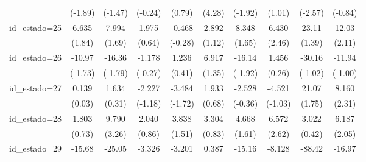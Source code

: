 {\begin{tabular}{l*{9}{c}}
                    &     (-1.89)         &     (-1.47)         &     (-0.24)         &      (0.79)         &      (4.28)         &     (-1.92)         &      (1.01)         &     (-2.57)         &     (-0.84)         \\
[1em]
id\_estado=25        &       6.635         &       7.994         &       1.975         &      -0.468         &       2.892         &       8.348         &       6.430\sym{*}  &       23.11         &       12.03\sym{*}  \\
                    &      (1.84)         &      (1.69)         &      (0.64)         &     (-0.28)         &      (1.12)         &      (1.65)         &      (2.46)         &      (1.39)         &      (2.11)         \\
[1em]
id\_estado=26        &      -10.97         &      -16.36         &      -1.178         &       1.236         &       6.917         &      -16.14         &       1.456         &      -30.16         &      -11.94         \\
                    &     (-1.73)         &     (-1.79)         &     (-0.27)         &      (0.41)         &      (1.35)         &     (-1.92)         &      (0.26)         &     (-1.02)         &     (-1.00)         \\
[1em]
id\_estado=27        &       0.139         &       1.634         &      -2.227         &      -3.484         &       1.933         &      -2.528         &      -4.521         &       21.07         &       8.160\sym{*}  \\
                    &      (0.03)         &      (0.31)         &     (-1.18)         &     (-1.72)         &      (0.68)         &     (-0.36)         &     (-1.03)         &      (1.75)         &      (2.31)         \\
[1em]
id\_estado=28        &       1.803         &       9.790\sym{**} &       2.040         &       3.838         &       3.304         &       4.668         &       6.572\sym{**} &       3.022         &       6.187\sym{*}  \\
                    &      (0.73)         &      (3.26)         &      (0.86)         &      (1.51)         &      (0.83)         &      (1.61)         &      (2.62)         &      (0.42)         &      (2.05)         \\
[1em]
id\_estado=29        &      -15.68\sym{**} &      -25.05\sym{**} &      -3.326         &      -3.201         &       0.387         &      -15.16\sym{*}  &      -8.128\sym{*}  &      -88.42\sym{***}&      -16.97\sym{*}  \\

\end{tabular}}
